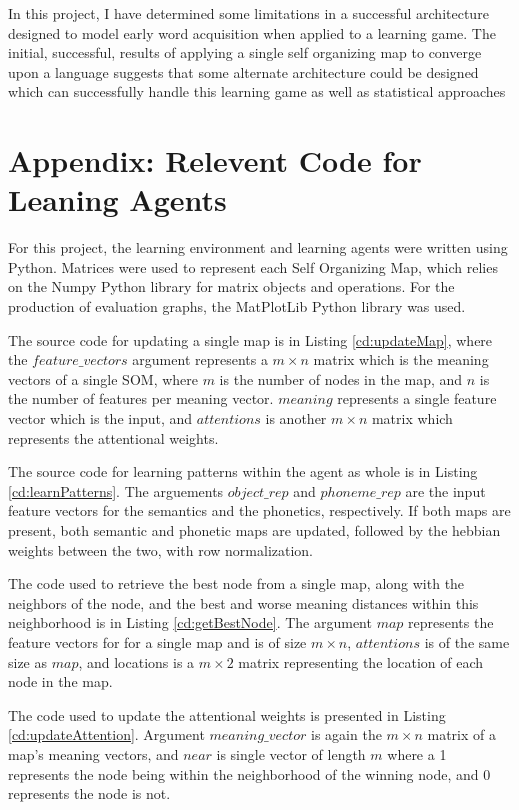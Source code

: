 \documentclass[a4paper,11pt]{article}
\begin{document}
In this project, I have determined some limitations in a successful architecture
designed to model early word acquisition when applied to a learning game.  The
initial, successful, results of applying a single self organizing map to
converge upon a language suggests that some alternate architecture could be
designed which can successfully handle this learning game as well as statistical
approaches 
 

\section{Appendix: Relevent Code for Leaning Agents}
For this project, the learning environment and learning agents were written
using Python.  Matrices were used to represent each Self Organizing Map, which
relies on the Numpy Python library for matrix objects and operations.  For the
production of evaluation graphs, the MatPlotLib Python library was used.

The source code for updating a single map is in Listing \ref{cd:updateMap},
where the $feature\_vectors$ argument represents a $m \times n$ matrix which is
the meaning vectors of a single SOM, where $m$ is the number of nodes in the
map, and $n$ is the number of features per meaning vector.  $meaning$ represents
a single feature vector which is the input, and $attentions$ is another $m
\times n$ matrix which represents the attentional weights.

The source code for learning patterns within the agent as whole is in Listing
\ref{cd:learnPatterns}.  The arguements $object\_rep$ and $phoneme\_rep$ are the
input feature vectors for the semantics and the phonetics, respectively.  If
both maps are present, both semantic and phonetic maps are updated, followed by
the hebbian weights between the two, with row normalization.

The code used to retrieve the best node from a single map, along with the neighbors of the
node, and the best and worse meaning distances within this neighborhood is in
Listing \ref{cd:getBestNode}.  The argument $map$ represents the feature vectors
for for a single map and is of size $m \times n$, $attentions$ is of the same
size as $map$, and locations is a $m \times 2$ matrix representing the
location of each node in the map.

The code used to update the attentional weights is presented in Listing
\ref{cd:updateAttention}.  Argument $meaning\_vector$ is again the $m \times n$
matrix of a map's meaning vectors, and $near$ is single vector of length $m$
where a 1 represents the node being within the neighborhood of the winning node,
and 0 represents the node is not.
\end{document}
